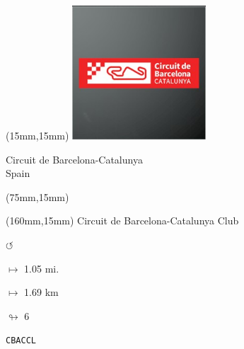 \begin{textblock*}{50mm}(15mm,15mm)%
\includegraphics[width=50mm]{LG/2015-05-20_00078.png}
\par Circuit de Barcelona-Catalunya\\ Spain
\end{textblock*}
\begin{textblock*}{80mm}(75mm,15mm)%
\end{textblock*}
\begin{textblock*}{40mm}(160mm,15mm)%
Circuit de Barcelona-Catalunya Club
\par \Huge$\circlearrowleft$
\Large
\par$\mapsto$ 1.05 mi.
\par$\mapsto$ 1.69 km
\par$\looparrowright$ 6
\par\hfill\tiny\tt CBACCL\\
\end{textblock*}
\null\newpage


